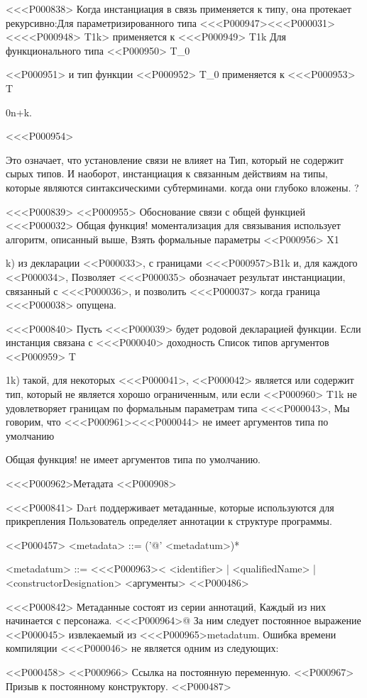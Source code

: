 {{{{{{{<<<P000838>%
Когда инстанциация в связь применяется к типу, она протекает рекурсивно:Для параметризированного типа <<<P000947><<<P000031><<<<P000948> T}{1}{k}>
применяется к <<<P000949> T}{1}{k}
Для функционального типа
<<P000950> T_0

<<P000951>
и тип функции
<<P000952> T_0
применяется к <<<P000953> T}{0}{n+k}.

<<<P000954>{%
Это означает, что установление связи не влияет на
Тип, который не содержит сырых типов.
И наоборот, инстанциация к связанным действиям на типы, которые являются синтаксическими субтерминами.
когда они глубоко вложены.%
?

<<<P000839>%
<<P000955> Обоснование связи с общей функцией <<<P000032>{%
Общая функция! моментализация для связывания
использует алгоритм, описанный выше,
Взять формальные параметры <<P000956> X}{1}{k) из декларации <<P000033>,
с границами <<<P000957>{B}{1}{k} и,
для каждого <<P000034>,
Позволяет <<<P000035> обозначает результат инстанциации, связанный с <<<P000036>,
и позволить <<<P000037>\DYNAMIC{} когда граница <<<P000038> опущена.

<<<P000840>%
Пусть <<<P000039> будет родовой декларацией функции.
Если инстанция связана с <<<P000040> доходность
Список типов аргументов <<P000959> T}{1}{k) такой,
для некоторых <<<P000041>,
<<P000042> является или содержит тип, который не является хорошо ограниченным,
или если <<P000960> T}{1}{k} не удовлетворяет границам
по формальным параметрам типа <<<P000043>,
Мы говорим, что
<<<P000961><<<P000044> не имеет аргументов типа по умолчанию {%
Общая функция! не имеет аргументов типа по умолчанию.


<<<P000962>{Метадата}
<<P000908>

<<<P000841>%
Dart поддерживает метаданные, которые используются для прикрепления
Пользователь определяет аннотации к структуре программы.

<<P000457>
<metadata> ::= ('@' <metadatum>)*

<metadatum> ::= <<<P000963><
<identifier> | <qualifiedName> | <constructorDesignation> <аргументы>
<<P000486>

<<<P000842>%
Метаданные состоят из серии аннотаций,
Каждый из них начинается с персонажа. <<<P000964>{@}
За ним следует постоянное выражение <<P000045> извлекаемый из
<<<P000965>{metadatum}.
Ошибка времени компиляции <<<P000046> не является одним из следующих:

<<P000458>
<<P000966> Ссылка на постоянную переменную.
<<P000967> Призыв к постоянному конструктору.
<<P000487>

}}}}}}
